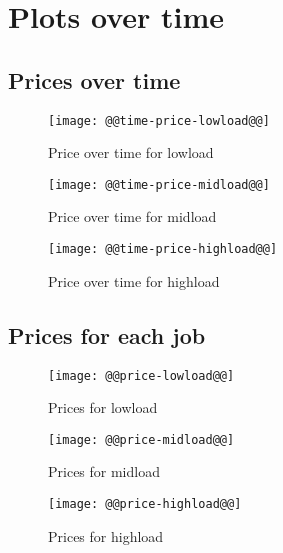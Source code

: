 \documentclass[11pt]{article}
\begin{document}
\newpage
\section{Plots over time}
\subsection{Prices over time}
\begin{figure}[htbp]
  \begin{center}
    \texttt{[image: @@time-price-lowload@@]}
    \caption{Price over time for lowload}
    \label{fig:time-price-lowload}
  \end{center}
\end{figure}
\begin{figure}[htbp]
  \begin{center}
    \texttt{[image: @@time-price-midload@@]}
    \caption{Price over time for midload}
    \label{fig:time-price-midload}
  \end{center}
\end{figure}
\begin{figure}[htbp]
  \begin{center}
    \texttt{[image: @@time-price-highload@@]}
    \caption{Price over time for highload}
    \label{fig:time-price-highload}
  \end{center}
\end{figure}

\newpage
\subsection{Prices for each job}
\begin{figure}[htbp]
  \begin{center}
    \texttt{[image: @@price-lowload@@]}
    \caption{Prices for lowload}
    \label{fig:price-lowload}
  \end{center}
\end{figure}
\begin{figure}[htbp]
  \begin{center}
    \texttt{[image: @@price-midload@@]}
    \caption{Prices for midload}
    \label{fig:price-midload}
  \end{center}
\end{figure}
\begin{figure}[htbp]
  \begin{center}
    \texttt{[image: @@price-highload@@]}
    \caption{Prices for highload}
    \label{fig:price-highload}
  \end{center}
\end{figure}
\end{document}
